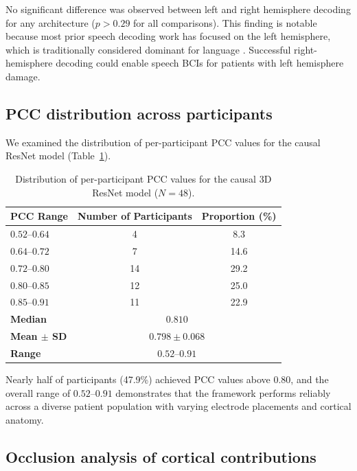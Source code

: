 \documentclass[11pt]{article}
\begin{document}
No significant difference was observed between left and right hemisphere decoding for any architecture ($p > 0.29$ for all comparisons). This finding is notable because most prior speech decoding work has focused on the left hemisphere, which is traditionally considered dominant for language \citep{hickok2007}. Successful right-hemisphere decoding could enable speech BCIs for patients with left hemisphere damage.

\subsection{PCC distribution across participants}

We examined the distribution of per-participant PCC values for the causal ResNet model (Table~\ref{tab:distribution}).

\begin{table}[H]
\centering
\caption{Distribution of per-participant PCC values for the causal 3D ResNet model ($N = 48$).}
\label{tab:distribution}
\begin{tabular}{lcc}
\toprule
\textbf{PCC Range} & \textbf{Number of Participants} & \textbf{Proportion (\%)} \\
\midrule
$0.52$--$0.64$ & 4 & 8.3 \\
$0.64$--$0.72$ & 7 & 14.6 \\
$0.72$--$0.80$ & 14 & 29.2 \\
$0.80$--$0.85$ & 12 & 25.0 \\
$0.85$--$0.91$ & 11 & 22.9 \\
\midrule
\textbf{Median} & \multicolumn{2}{c}{$0.810$} \\
\textbf{Mean $\pm$ SD} & \multicolumn{2}{c}{$0.798 \pm 0.068$} \\
\textbf{Range} & \multicolumn{2}{c}{$0.52$--$0.91$} \\
\bottomrule
\end{tabular}
\end{table}

Nearly half of participants (47.9\%) achieved PCC values above 0.80, and the overall range of $0.52$--$0.91$ demonstrates that the framework performs reliably across a diverse patient population with varying electrode placements and cortical anatomy.

\subsection{Occlusion analysis of cortical contributions}
\end{document}
